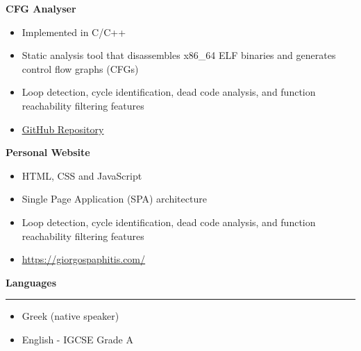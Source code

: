 \documentclass[12pt]{article}
\begin{document}
\vspace{0.5cm}
\textbf{\textcolor{bgcolor}{CFG Analyser}}\\[0.5em]
{\renewcommand{\labelitemi}{\textcolor{bgcolor}{\normalsize$\bullet$}}%
   \begin{itemize}[leftmargin=33pt, itemsep=0pt, topsep=0pt]
      \item Implemented in C/C++\\
      \item Static analysis tool that disassembles x86\_64 ELF binaries and generates control flow graphs (CFGs)\\
      \item Loop detection, cycle identification, dead code analysis, and function reachability filtering features\\
      \item \href{https://github.com/gpaphitis/CFGAnalyzer}{\underline{GitHub Repository}}\\
   \end{itemize}
}
\vspace{0.5cm}
\textbf{\textcolor{bgcolor}{Personal Website}}\\[0.5em]
{\renewcommand{\labelitemi}{\textcolor{bgcolor}{\normalsize$\bullet$}}%
   \begin{itemize}[leftmargin=33pt, itemsep=0pt, topsep=0pt]
      \item HTML, CSS and JavaScript\\
      \item Single Page Application (SPA) architecture\\
      \item Loop detection, cycle identification, dead code analysis, and function reachability filtering features\\
      \item \href{https://giorgospaphitis.com/}{\underline{https://giorgospaphitis.com/}}\\
   \end{itemize}
}
\vspace{1cm}
{\fontsize{14pt}{13pt}\selectfont
   \textbf{\textcolor{bgcolor}{Languages}}\\[0.3em]
}
\hrule
\vspace{0.5cm}
{\renewcommand{\labelitemi}{\textcolor{bgcolor}{\normalsize$\bullet$}}%
   \begin{itemize}[leftmargin=13pt, itemsep=0pt, topsep=0pt]
      \item Greek (native speaker)\\
      \item English - IGCSE Grade A\\
   \end{itemize}
}
\end{document}
